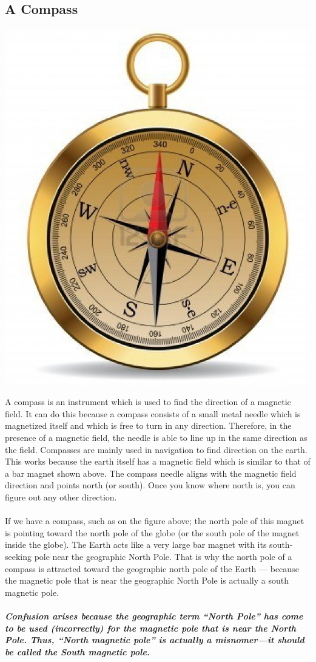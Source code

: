 \documentclass[9pt]{article}
\begin{document}
	\subsection*{A Compass}
	\begin{center}
		\includegraphics[scale=0.1]{compass}
	\end{center}
	A compass is an instrument which is used to find the direction of a magnetic field. It can do this because a compass consists of a small metal needle which is magnetized itself and which is free to turn in any direction. Therefore, in the presence of a magnetic field, the needle is able to line up in the same direction as the field. Compasses are mainly used in navigation to find direction on the earth. This works because the earth itself has a magnetic field which is similar to that of a bar magnet shown above. The compass needle aligns with the magnetic field direction and points north (or south). Once you know where north is, you can figure out any other direction. \\ \\
	If we have a compass, such as on the figure above; the north pole of this magnet is pointing toward the north pole of the globe (or the south pole of the magnet inside the globe). The Earth acts like a very large bar magnet with its south-seeking pole near the geographic North Pole. That is why the north pole of a compass is attracted toward the geographic north pole of the Earth — because the magnetic pole that is near the geographic North Pole is actually a south magnetic pole. \\ \\ \textbf{\textit{Confusion arises because the geographic term “North Pole” has come to be used (incorrectly) for the magnetic pole that is near the North Pole. Thus, “North magnetic pole” is actually a misnomer—it should be called the South magnetic pole.}}
\end{document}
